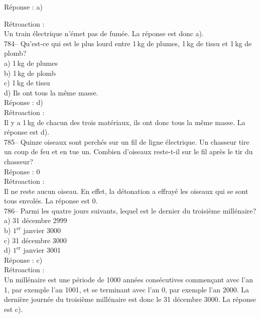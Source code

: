 ﻿\documentclass[letterpaper, 12pt]{article}
\begin{document}
R\'eponse : a)

R\'etroaction : \\
Un train \'electrique n'\'emet pas de fum\'ee. La r\'eponse est donc a).\\

784-- Qu'est-ce qui est le plus lourd entre 1\,kg de plumes, 1\,kg de tissu
et 1\,kg de plomb?\\
a) 1\,kg de plumes\\
b) 1\,kg de plomb\\
c) 1\,kg de tissu\\
d) Ils ont tous la m\^eme masse.\\

R\'eponse : d)\\

R\'etroaction : \\
Il y a 1\,kg de chacun des trois mat\'eriaux, ils ont donc tous la m\^eme
masse.  La r\'eponse est d).\\

785-- Quinze oiseaux sont perch\'es sur un fil de ligne \'electrique.  Un
chasseur tire un coup de feu et en tue un.  Combien d'oiseaux reste-t-il sur
le fil apr\`es le tir du chasseur?\\

R\'eponse : 0\\

R\'etroaction : \\
Il ne reste aucun oiseau. En effet, la d\'etonation a effray\'e les oiseaux
qui se sont tous envol\'es. La r\'eponse est 0. \\

786-- Parmi les quatre jours suivants, lequel est le dernier du troisi\`eme
mill\'enaire?\\
a) 31 d\'ecembre 2999\\
b) $1^{\textrm{er}}$ janvier 3000\\
c) 31 d\'ecembre 3000\\
d) $1^{\textrm{er}}$ janvier 3001\\

R\'eponse : c)\\

R\'etroaction : \\
Un mill\'enaire est une p\'eriode de 1000 ann\'ees cons\'ecutives commen\c
cant avec l'an 1, par exemple l'an 1001, et se terminant avec l'an 0, par
exemple l'an 2000.  La derni\`ere journ\'ee du troisi\`eme mill\'enaire est
donc le 31 d\'ecembre 3000.  La r\'eponse est c).\\
\end{document}
